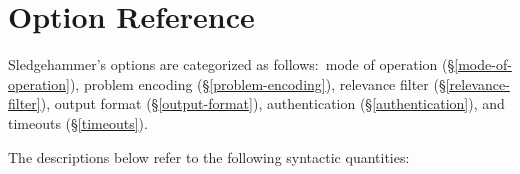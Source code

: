 \documentclass[a4paper,12pt]{article}
\def\qtybf#1{$\mathbf{\left<\textbf{\textit{#1\/}}\right>}$}
\begin{document}
\section{Option Reference}
\label{option-reference}

\def\defl{\{}
\def\defr{\}}

\def\flushitem#1{\item[]\noindent\kern-\leftmargin \textbf{#1}}
\def\optrue#1#2{\flushitem{\textit{#1} $\bigl[$= \qtybf{bool}$\bigr]$\enskip \defl\textit{true}\defr\hfill (neg.: \textit{#2})}\nopagebreak\\[\parskip]}
\def\opfalse#1#2{\flushitem{\textit{#1} $\bigl[$= \qtybf{bool}$\bigr]$\enskip \defl\textit{false}\defr\hfill (neg.: \textit{#2})}\nopagebreak\\[\parskip]}
\def\opsmart#1#2{\flushitem{\textit{#1} $\bigl[$= \qtybf{smart\_bool}$\bigr]$\enskip \defl\textit{smart}\defr\hfill (neg.: \textit{#2})}\nopagebreak\\[\parskip]}
\def\opsmartx#1#2{\flushitem{\textit{#1} $\bigl[$= \qtybf{smart\_bool}$\bigr]$\enskip \defl\textit{smart}\defr\\\hbox{}\hfill (neg.: \textit{#2})}\nopagebreak\\[\parskip]}
\def\opnodefault#1#2{\flushitem{\textit{#1} = \qtybf{#2}} \nopagebreak\\[\parskip]}
\def\opnodefaultbrk#1#2{\flushitem{$\bigl[$\textit{#1} =$\bigr]$ \qtybf{#2}} \nopagebreak\\[\parskip]}
\def\opdefault#1#2#3{\flushitem{\textit{#1} = \qtybf{#2}\enskip \defl\textit{#3}\defr} \nopagebreak\\[\parskip]}
\def\oparg#1#2#3{\flushitem{\textit{#1} \qtybf{#2} = \qtybf{#3}} \nopagebreak\\[\parskip]}
\def\opargbool#1#2#3{\flushitem{\textit{#1} \qtybf{#2} $\bigl[$= \qtybf{bool}$\bigr]$\hfill (neg.: \textit{#3})}\nopagebreak\\[\parskip]}
\def\opargboolorsmart#1#2#3{\flushitem{\textit{#1} \qtybf{#2} $\bigl[$= \qtybf{smart\_bool}$\bigr]$\hfill (neg.: \textit{#3})}\nopagebreak\\[\parskip]}

Sledgehammer's options are categorized as follows:\ mode of operation
(\S\ref{mode-of-operation}), problem encoding (\S\ref{problem-encoding}),
relevance filter (\S\ref{relevance-filter}), output format
(\S\ref{output-format}), authentication (\S\ref{authentication}), and timeouts
(\S\ref{timeouts}).

The descriptions below refer to the following syntactic quantities:
\end{document}
